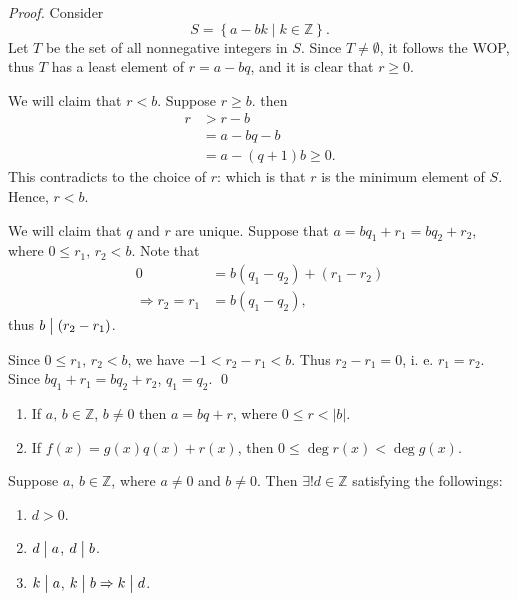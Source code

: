 \begin{proof}
    Consider
    \[
        S = \left\{a-bk \mid k \in \mathbb{Z}\right\}.
    \]
    Let $T$ be the set of all nonnegative integers in $S$. Since $T \neq \emptyset$, it follows the WOP,
    thus $T$ has a least element of $r = a-bq$, and it is clear that $r \geq 0$.

    We will claim that $r < b$. Suppose $r \geq b$. then
    \begin{align*}
        r &> r-b \\
        &= a - bq - b \\
        &= a - \left(q+1\right)b \geq 0.
    \end{align*}
    This contradicts to the choice of $r$: which is that $r$ is the minimum element of $S$.
    Hence, $r<b$.
    
    We will claim that $q$ and $r$ are unique. Suppose that $a=bq_1+r_1=bq_2+r_2$, 
    where $0 \leq r_1,\,r_2 < b$.
    Note that
    \begin{align*}
        0&=b\left(q_1-q_2\right)+\left(r_1-r_2\right)\\
        \Rightarrow r_2=r_1&=b\left(q_1-q_2\right),
    \end{align*}
    thus $b \bigm|\left(r_2-r_1\right)$.

    Since $0 \leq r_1,\,r_2 < b$, we have $-1 < r_2-r_1 < b$.
    Thus $r_2-r_1=0$, i. e. $r_1=r_2$.
    Since $bq_1+r_1=bq_2+r_2$, $q_1=q_2$. \qed
\end{proof}


\begin{remark}
    \begin{enumerate}
        \item If $a,\,b\in\mathbb{Z}$, $b\neq 0$ then $a=bq+r$, where $0\leq r<\left|b\right|$.
        \item If $f\left(x\right)=g\left(x\right)q\left(x\right)+r\left(x\right)$,
        then $0 \leq \operatorname{\mathrm{deg}} r\left(x\right) < \operatorname{\mathrm{deg}} g\left(x\right)$.
    \end{enumerate}
\end{remark}

\begin{theorem}
    Suppose $a,\,b\in\mathbb{Z}$, where $a \neq 0$ and $b \neq 0$.
    Then $\exists! d\in \mathbb{Z}$ satisfying the followings:
    \begin{enumerate}
        \item $d>0$.
        \item $d \bigm| a$, $d \bigm| b$.
        \item $k \bigm| a$, $k \bigm| b \Rightarrow k \bigm| d$.
    \end{enumerate}
\end{theorem}

